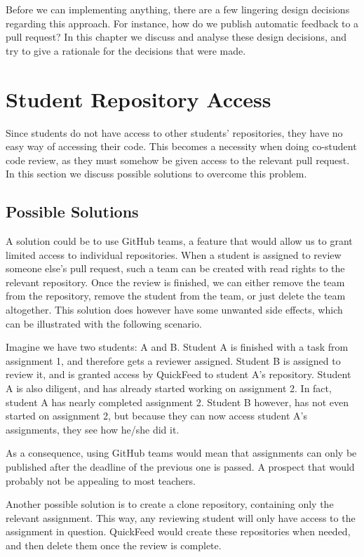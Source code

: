 Before we can implementing anything, there are a few lingering design decisions regarding this approach.
For instance, how do we publish automatic feedback to a pull request?
In this chapter we discuss and analyse these design decisions, and try to give a rationale for the decisions that were made.

\section{Student Repository Access}
\label{sec:student-repositoriy-access}

Since students do not have access to other students' repositories, they have no easy way of accessing their code.
This becomes a necessity when doing co-student code review, as they must somehow be given access to the relevant pull request.
In this section we discuss possible solutions to overcome this problem.

\subsection{Possible Solutions}

A solution could be to use GitHub teams, a feature that would allow us to grant limited access to individual repositories.
When a student is assigned to review someone else's pull request, such a team can be created with read rights to the relevant repository.
Once the review is finished, we can either remove the team from the repository, remove the student from the team, or just delete the team altogether.
This solution does however have some unwanted side effects, which can be illustrated with the following scenario.

Imagine we have two students: A and B.
Student A is finished with a task from assignment 1, and therefore gets a reviewer assigned.
Student B is assigned to review it, and is granted access by QuickFeed to student A's repository.
Student A is also diligent, and has already started working on assignment 2.
In fact, student A has nearly completed assignment 2.
Student B however, has not even started on assignment 2, but because they can now access student A's assignments, they see how he/she did it.

As a consequence, using GitHub teams would mean that assignments can only be published after the deadline of the previous one is passed.
A prospect that would probably not be appealing to most teachers.

Another possible solution is to create a clone repository, containing only the relevant assignment. 
This way, any reviewing student will only have access to the assignment in question.
QuickFeed would create these repositories when needed, and then delete them once the review is complete.

